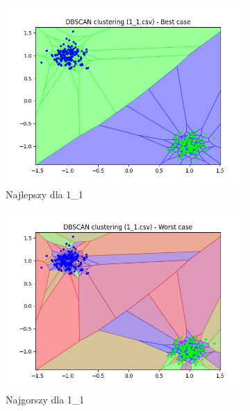 \documentclass[12pt]{article}
\begin{document}
\begin{figure}[H]
    \centering
    \begin{subfigure}[b]{0.24\textwidth}
        \includegraphics[width=\linewidth]{img/exp_2/dbscan/1_1_best.png}
        \caption{Najlepszy dla 1\_1}
    \end{subfigure}
    \hfill
    \begin{subfigure}[b]{0.24\textwidth}
        \includegraphics[width=\linewidth]{img/exp_2/dbscan/1_1_worst.png}
        \caption{Najgorszy dla 1\_1}
    \end{subfigure}
    \hfill
    \begin{subfigure}[b]{0.24\textwidth}

\end{subfigure}
\end{figure}
\end{document}
